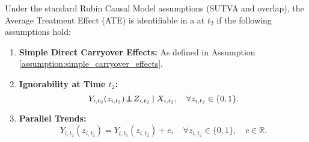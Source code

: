 \begin{retheorem}
Under the standard Rubin Causal Model assumptions (SUTVA and overlap), the Average Treatment Effect (ATE) is identifiable in a \cwsd{} at $t_2$ if the following assumptions hold:
\begin{enumerate}
    \item \textbf{Simple Direct Carryover Effects:} As defined in Assumption \ref{assumption:simple_carryover_effects}.
    \item \textbf{Ignorability at Time \(t_2\):} 
    \[
    Y_{i,t_2}(z_{i,t_2}) \hspace{-.2em}\perp\!\!\!\!\perp\hspace{-.2em} Z_{i,t_2} \mid X_{i,t_2}, \quad \forall z_{i,t_2} \in \{0,1\}.
    \]
    \item \textbf{Parallel Trends:} 
    \[
    Y_{i,t_2}(z_{i,t_2}) = Y_{i,t_1}(z_{i,t_2}) + c, \quad \forall z_{i,t_2} \in \{0,1\}, \quad c \in \mathbb{R}.
    \]
\end{enumerate}
\end{retheorem}

